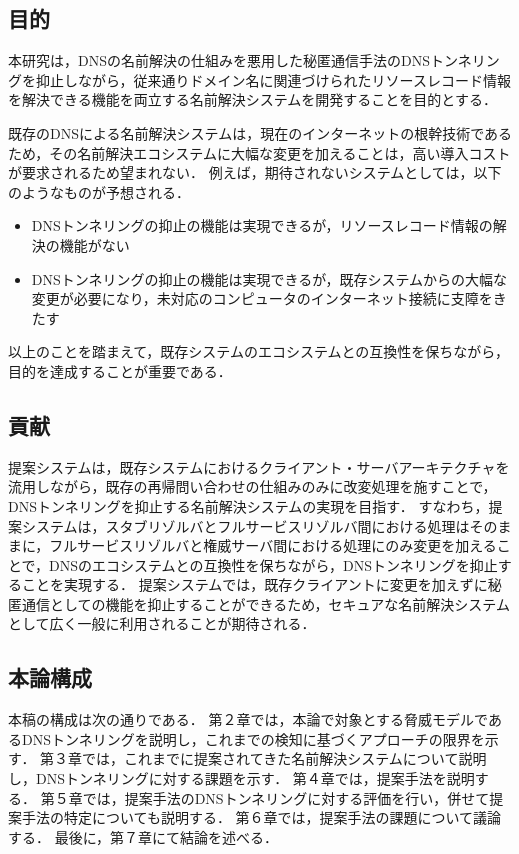 \subsection{目的}
本研究は，DNSの名前解決の仕組みを悪用した秘匿通信手法のDNSトンネリングを抑止しながら，従来通りドメイン名に関連づけられたリソースレコード情報を解決できる機能を両立する名前解決システムを開発することを目的とする．

既存のDNSによる名前解決システムは，現在のインターネットの根幹技術であるため，その名前解決エコシステムに大幅な変更を加えることは，高い導入コストが要求されるため望まれない．
例えば，期待されないシステムとしては，以下のようなものが予想される．
\begin{itemize}
 \setlength{\itemsep}{-0.5mm}
 \item DNSトンネリングの抑止の機能は実現できるが，リソースレコード情報の解決の機能がない
 \item DNSトンネリングの抑止の機能は実現できるが，既存システムからの大幅な変更が必要になり，未対応のコンピュータのインターネット接続に支障をきたす
\end{itemize}
以上のことを踏まえて，既存システムのエコシステムとの互換性を保ちながら，目的を達成することが重要である．

\subsection{貢献}
提案システムは，既存システムにおけるクライアント・サーバアーキテクチャを流用しながら，既存の再帰問い合わせの仕組みのみに改変処理を施すことで，DNSトンネリングを抑止する名前解決システムの実現を目指す．
すなわち，提案システムは，スタブリゾルバとフルサービスリゾルバ間における処理はそのままに，フルサービスリゾルバと権威サーバ間における処理にのみ変更を加えることで，DNSのエコシステムとの互換性を保ちながら，DNSトンネリングを抑止することを実現する．
提案システムでは，既存クライアントに変更を加えずに秘匿通信としての機能を抑止することができるため，セキュアな名前解決システムとして広く一般に利用されることが期待される．





\subsection{本論構成}
本稿の構成は次の通りである．
第２章では，本論で対象とする脅威モデルであるDNSトンネリングを説明し，これまでの検知に基づくアプローチの限界を示す．
第３章では，これまでに提案されてきた名前解決システムについて説明し，DNSトンネリングに対する課題を示す．
第４章では，提案手法を説明する．
第５章では，提案手法のDNSトンネリングに対する評価を行い，併せて提案手法の特定についても説明する．
第６章では，提案手法の課題について議論する．
最後に，第７章にて結論を述べる．
